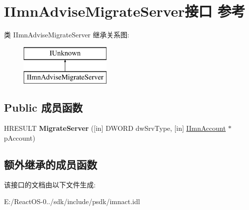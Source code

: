 \hypertarget{interface_i_imn_advise_migrate_server}{}\section{I\+Imn\+Advise\+Migrate\+Server接口 参考}
\label{interface_i_imn_advise_migrate_server}
类 I\+Imn\+Advise\+Migrate\+Server 继承关系图\+:\begin{figure}[H]
\begin{center}
\leavevmode
\includegraphics[height=2.000000cm]{interface_i_imn_advise_migrate_server}
\end{center}
\end{figure}
\subsection*{Public 成员函数}
\begin{DoxyCompactItemize}
\item 
\mbox{\label{interface_i_imn_advise_migrate_server_af9167b5b08b5b41c693c449e4f5127d0}} 
H\+R\+E\+S\+U\+LT {\bfseries Migrate\+Server} (\mbox{[}in\mbox{]} D\+W\+O\+RD dw\+Srv\+Type, \mbox{[}in\mbox{]} \hyperlink{interface_i_imn_account}{I\+Imn\+Account} $\ast$p\+Account)
\end{DoxyCompactItemize}
\subsection*{额外继承的成员函数}


该接口的文档由以下文件生成\+:\begin{DoxyCompactItemize}
\item 
E\+:/\+React\+O\+S-\/0../sdk/include/psdk/imnact.\+idl\end{DoxyCompactItemize}
